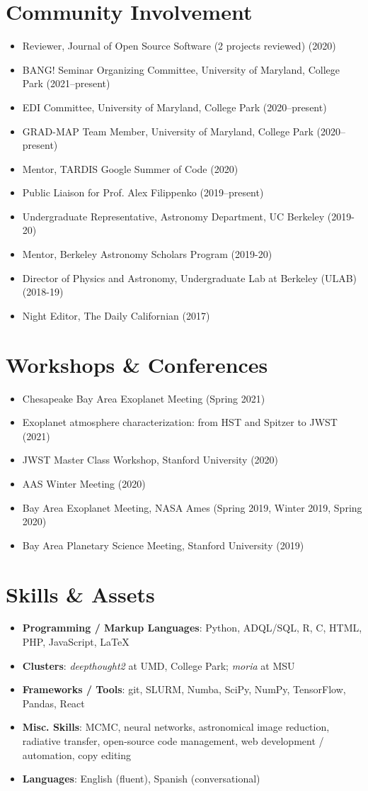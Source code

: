 \documentclass[letterpaper,10.5pt]{article}
\newcommand{\resumeItem}[2]{
  \item\small{
    \textbf{#1}{#2 \vspace{-2pt}}
  }
}
\newcommand{\resumeSubHeadingListStart}{\begin{itemize}[leftmargin=*]}
\newcommand{\resumeSubHeadingListEnd}{\end{itemize}}
\newcommand{\resumeItemListStart}{\begin{itemize}}
\newcommand{\resumeItemListEnd}{\end{itemize}\vspace{-5pt}}
\newcommand{\shorterSection}[1]{\vspace{-10pt}\section{#1}}
\begin{document}
\shorterSection{Community Involvement}
\resumeItemListStart
\item Reviewer, Journal of Open Source Software (2 projects reviewed) (2020)
\resumeItem{}{BANG! Seminar Organizing Committee, University of Maryland, College Park (2021--present)}
\resumeItem{}{EDI Committee, University of Maryland, College Park (2020--present)}
\resumeItem{}{GRAD-MAP Team Member, University of Maryland, College Park (2020--present)}
\resumeItem{}{Mentor, TARDIS Google Summer of Code (2020)}
\resumeItem{}{Public Liaison for Prof. Alex Filippenko (2019--present)}
\resumeItem{}{Undergraduate Representative, Astronomy Department, UC Berkeley (2019-20)}
\resumeItem{}{Mentor, Berkeley Astronomy Scholars Program (2019-20)}
\resumeItem{}{Director of Physics and Astronomy, Undergraduate Lab at Berkeley (ULAB) (2018-19)}
\resumeItem{}{Night Editor, The Daily Californian (2017)}
\resumeItemListEnd

\newpage

\shorterSection{Workshops \& Conferences}
\resumeItemListStart
\resumeItem{}{Chesapeake Bay Area Exoplanet Meeting (Spring 2021)}
\resumeItem{}{Exoplanet atmosphere characterization: from HST and Spitzer to JWST (2021)}
\resumeItem{}{JWST Master Class Workshop, Stanford University (2020)}
\resumeItem{}{AAS Winter Meeting (2020)}
\resumeItem{}{Bay Area Exoplanet Meeting, NASA Ames (Spring 2019, Winter 2019, Spring 2020)}
\resumeItem{}{Bay Area Planetary Science Meeting, Stanford University (2019)}
\resumeItemListEnd


\shorterSection{Skills \& Assets}
  \resumeSubHeadingListStart
  \small
    \item{
     \textbf{Programming / Markup Languages}{: Python, ADQL/SQL, R, C, HTML, PHP, JavaScript, \LaTeX}
    }
    \vspace{-5pt}
    \item{
     \textbf{Clusters}{: \textit{deepthought2} at UMD, College Park; \textit{moria} at MSU}
    }
    \vspace{-5pt}
    \item{
     \textbf{Frameworks / Tools}{: git, SLURM, Numba, SciPy, NumPy, TensorFlow, Pandas, React}
    }
    \vspace{-5pt}
    \item{
     \textbf{Misc. Skills}{: MCMC, neural networks, astronomical image reduction, radiative transfer, open-source code management, web development / automation, copy editing}
    }
    \vspace{-5pt}
    \item{
     \textbf{Languages}{: English (fluent), Spanish (conversational)}
    }
\resumeSubHeadingListEnd
\end{document}
